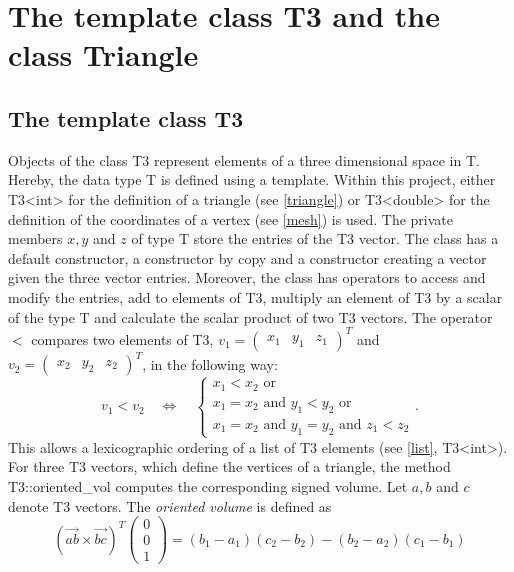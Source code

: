 \documentclass[10pt]{article}
\begin{document}
\section{The template class T3 and the class Triangle}

\subsection{The template class T3} \label{T3}

Objects of the class {\ttfamily T3} represent elements of a three dimensional space in {\ttfamily T}. Hereby, the data type {\ttfamily T} is defined using a template. Within this project, either {\ttfamily T3<int>} for the definition of a triangle (see \ref{triangle}) or {\ttfamily T3<double>} for the definition of the coordinates of a vertex (see \ref{mesh}) is used. The private members $x,y$ and $z$ of type {\ttfamily T} store the entries of the {\ttfamily T3} vector. The class has a default constructor, a constructor by copy and a constructor creating a vector given the three vector entries. Moreover, the class has operators to access and modify the entries, add to elements of {\ttfamily T3}, multiply an element of {\ttfamily T3} by a scalar of the type {\ttfamily T} and calculate the scalar product of two {\ttfamily T3} vectors. The operator $<$ compares two elements of {\ttfamily T3}, $v_1 = \begin{pmatrix} x_1 & y_1 & z_1 \end{pmatrix}^T$ and $v_2 = \begin{pmatrix} x_2 & y_2 & z_2 \end{pmatrix}^T$, in the following way:
$$ v_1 < v_2 \quad \Leftrightarrow \quad \begin{cases}
 x_1 < x_2 \text{ or }\\
 x_1 = x_2 \text{ and } y_1 < y_2 \text{ or }\\
 x_1 = x_2 \text{ and } y_1 = y_2 \text{ and } z_1 < z_2
\end{cases}. $$ 
This allows a lexicographic ordering of a list of {\ttfamily T3} elements (see \ref{list}, {\ttfamily T3<int>}). For three {\ttfamily T3} vectors, which define the vertices of a triangle, the method {\ttfamily T3::oriented\_vol } computes the corresponding signed volume. Let $a,b$ and $c$ denote {\ttfamily T3} vectors. The {\itshape oriented volume }is defined as
$$ \left( \overrightarrow{ab} \times \overrightarrow{bc} \right)^T \begin{pmatrix} 0 \\ 0 \\ 1 \end{pmatrix} = (b_1-a_1)(c_2-b_2) - (b_2-a_2)(c_1-b_1)$$
\end{document}

